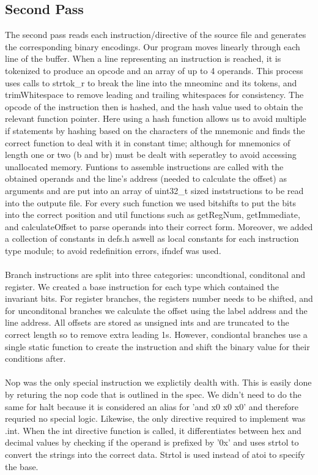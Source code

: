 \documentclass[11pt]{article}
\begin{document}
\subsection{Second Pass}
The second pass reads each instruction/directive of the source file and generates the corresponding binary encodings. Our program moves linearly through each line of the buffer. When a line representing an instruction is reached, it is tokenized to produce an opcode and an array of up to 4 operands. This process uses calls to strtok\_r to break the line into the mneominc and its tokens, and trimWhitespace to remove leading and trailing whitespaces for consistency. The opcode of the instruction then is hashed, and the hash value used to obtain the relevant function pointer. Here using a hash function allows us to avoid multiple if statements by hashing based on the characters of the mnemonic and finds the correct function to deal with it in constant time; although for mnemonics of length one or two (b and br) must be dealt with seperatley to avoid accessing unallocated memory. Funtions to assemble instructions are called with the obtained operands and the line's address (needed to calculate the offset) as arguments and are put into an array of uint32\_t sized inststructions to be read into the outpute file. For every such function we used bitshifts to put the bits into the correct position and util functions such as getRegNum, getImmediate, and calculateOffset to parse operands into their correct form. Moreover, we added a collection of constants in defs.h aswell as local constants for each instruction type module; to avoid redefinition errors, ifndef was used. \\\\
Branch instructions are split into three categories: uncondtional, conditonal and 	register. We created a base instruction for each type which contained the invariant bits. For register branches, the registers number needs to be shifted, and for unconditonal branches we calculate the offset using the label address and the line address. All offsets are stored as unsigned ints and are truncated to the correct length so to remove extra leading 1s. However, condiontal branches use a single static function to create the instruction and shift the binary value for their conditions after. \\\\
Nop was the only special instruction we explictily dealth with. This is easily done by returing the nop code that is outlined in the spec. We didn't need to do the same for halt because it is considered an alias for 'and x0 x0 x0' and therefore requried no special logic. Likewise, the only directive required to implement was .int. When the int directive function is called, it differentiates between hex and decimal values by checking if the operand is prefixed by '0x' and uses strtol to convert the strings into the correct data. Strtol is used instead of atoi to specify the base. \\\\
\end{document}
